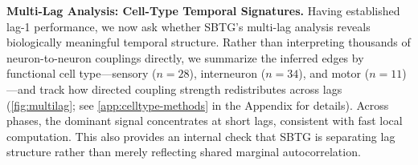 \documentclass{article}
\theoremstyle{plain}
\theoremstyle{definition}
\theoremstyle{remark}
\newcommand{\1}{\mathbf{1}}
\begin{document}

\textbf{Multi-Lag Analysis: Cell-Type Temporal Signatures.} Having established lag-1 performance, we now ask whether SBTG's multi-lag analysis reveals biologically meaningful temporal structure. Rather than interpreting thousands of neuron-to-neuron couplings directly, we summarize the inferred edges by functional cell type---sensory ($n = 28$), interneuron ($n = 34$), and motor ($n = 11$)---and track how directed coupling strength redistributes across lags (\cref{fig:multilag}; see \cref{app:celltype-methods} in the Appendix for details). Across phases, the dominant signal concentrates at short lags, consistent with fast local computation. This also provides an internal check that SBTG is separating lag structure rather than merely reflecting shared marginal autocorrelation.
\end{document}
